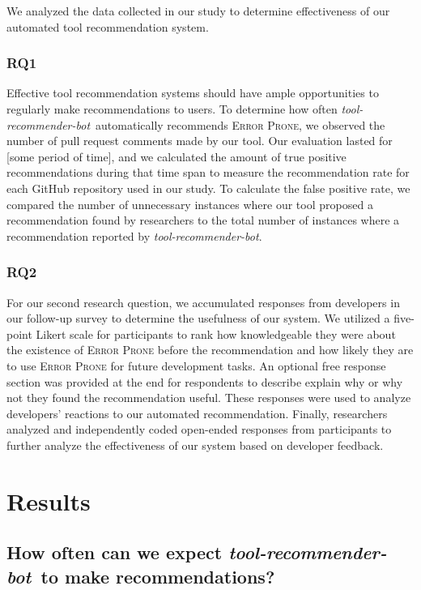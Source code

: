 \documentclass[sigconf,review,anonymous]{acmart}
\newcommand{\tool}{\textsl{tool-recommender-bot}}
\begin{document}
We analyzed the data collected in our study to determine effectiveness of our automated tool recommendation system.

\subsubsection{RQ1}

Effective tool recommendation systems should have ample opportunities to regularly make recommendations to users. To determine how often \tool~automatically recommends \textsc{Error Prone}, we observed the number of pull request comments made by our tool. Our evaluation lasted for [some period of time], and we calculated the amount of true positive recommendations during that time span to measure the recommendation rate for each GitHub repository used in our study. To calculate the false positive rate, we compared the number of unnecessary instances where our tool proposed a recommendation found by researchers to the total number of instances where a recommendation reported by \tool.

\subsubsection{RQ2}

For our second research question, we accumulated responses from developers in our follow-up survey to determine the usefulness of our system. We utilized a five-point Likert scale for participants to rank how knowledgeable they were about the existence of \textsc{Error Prone} before the recommendation and how likely they are to use \textsc{Error Prone} for future development tasks. An optional free response section was provided at the end for respondents to describe explain why or why not they found the recommendation useful. These responses were used to analyze developers' reactions to our automated recommendation. Finally, researchers analyzed and independently coded open-ended responses from participants to further analyze the effectiveness of our system based on developer feedback.

\section{Results}

\subsection{How often can we expect \tool~to make recommendations?}
\end{document}
